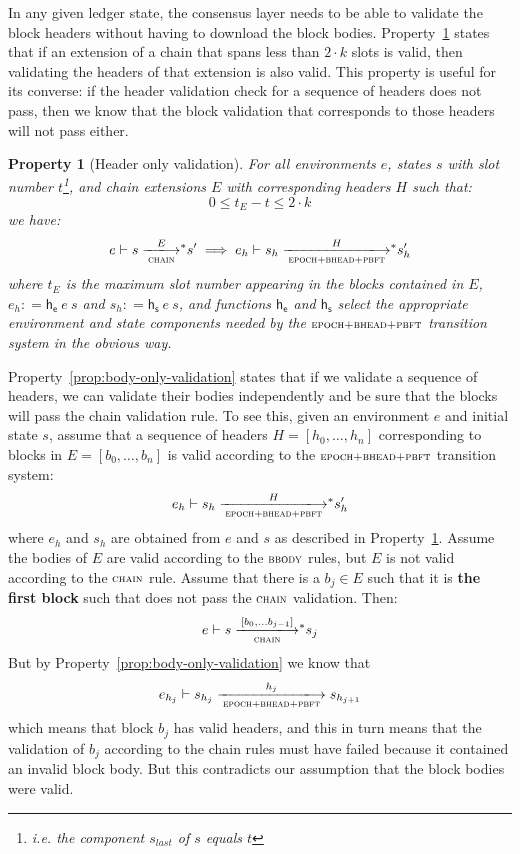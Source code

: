 \documentclass[11pt,a4paper]{article}
\newcommand{\var}[1]{\mathit{#1}}
\newcommand{\fun}[1]{\mathsf{#1}}
\newcommand{\trans}[2]{\xlongrightarrow[\textsc{#1}]{#2}}
\newcommand{\stslabel}[1]{\footnotesize{\textsc{#1}}}
\newcommand{\leteq}{\ensuremath{\mathrel{\mathop:}=}}
\newcommand{\transtar}[2]{\xlongrightarrow[\textsc{#1}]{#2}\negthickspace^{*}}
\newtheorem{property}{Property}
\begin{document}
In any given ledger state, the consensus layer needs to be able to validate the
block headers without having to download the block bodies.
Property~\ref{prop:header-only-validation} states that if an extension of a
chain that spans less than $2 \cdot k$ slots is valid, then validating the
headers of that extension is also valid. This property is useful for its
converse: if the header validation check for a sequence of headers does not
pass, then we know that the block validation that corresponds to those headers
will not pass either.

\begin{property}[Header only validation]\label{prop:header-only-validation}
  For all environments $e$, states $s$ with slot number $t$\footnote{i.e. the
    component $\var{s_{last}}$ of $s$ equals $t$}, and chain extensions $E$
  with corresponding headers $H$ such that:
  $$
  0 \leq t_E - t  \leq 2 \cdot k
  $$
  we have:
  $$
  e \vdash s \transtar{chain}{E} s' \implies e_h \vdash s_h \transtar{epoch+bhead+pbft}{H} s'_h
  $$
  where $t_E$ is the maximum slot number appearing in the blocks contained in
  $E$, $e_h \leteq \fun{h_e}~e~s$ and $s_h \leteq \fun{h_s}~e~s$, and functions $\fun{h_e}$
  and $\fun{h_s}$ select the appropriate environment and state components
  needed by the $\stslabel{epoch+bhead+pbft}$ transition system in the obvious way.
\end{property}

Property~\ref{prop:body-only-validation} states that if we validate a sequence
of headers, we can validate their bodies independently and be sure that the
blocks will pass the chain validation rule. To see this, given an environment
$e$ and initial state $s$, assume that a sequence of headers
$H = [h_0, \ldots, h_n]$ corresponding to blocks in $E = [b_0, \ldots, b_n]$ is
valid according to the $\stslabel{epoch+bhead+pbft}$ transition system:
%
$$
e_h \vdash s_h \transtar{epoch+bhead+pbft}{H} s'_h
$$
%
where $e_h$ and $s_h$ are obtained from $e$ and $s$ as described in
Property~\ref{prop:header-only-validation}. Assume the bodies of $E$ are valid
according to the $\stslabel{bbody}$ rules, but $E$ is not valid according to
the $\stslabel{chain}$ rule. Assume that there is a $b_j \in E$ such that it is
\textbf{the first block} such that does not pass the $\stslabel{chain}$
validation. Then:
%
$$
e \vdash s \transtar{chain}{[b_0, \ldots b_{j-1}]} s_j
$$
But by Property~\ref{prop:body-only-validation} we know that
%
$$
e_{h_j} \vdash s_{h_j} \trans{epoch+bhead+pbft}{h_j} s_{h_{j+1}}
$$
which means that block $b_j$ has valid headers, and this in turn means that the
validation of $b_j$ according to the chain rules must have failed because it
contained an invalid block body. But this contradicts our assumption that the
block bodies were valid.
\end{document}
